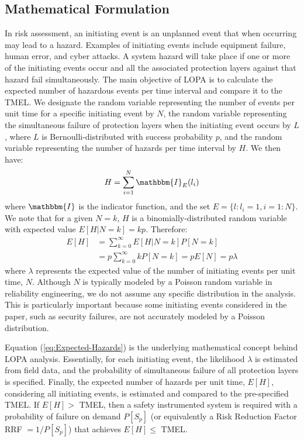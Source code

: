 \documentclass[journal]{IEEEtran}
\begin{document}
\subsection{Mathematical Formulation}
In risk assessment, an initiating event is an unplanned event that when occurring may lead to a hazard. Examples of initiating events include equipment failure, human error, and cyber attacks. A system hazard will take place if one or more of the initiating events occur and all the associated protection layers against that hazard fail simultaneously. The main objective of LOPA is to calculate the expected number of hazardous events per time interval and compare it to the TMEL. We designate the random variable representing the number of events per unit time for a specific initiating event by $N$, the random variable representing the simultaneous failure of protection layers when the initiating event occurs by $L$, where $L$ is Bernoulli-distributed with success probability $p$, and the random variable representing the number of hazards per time interval by $H$. We then have:
\begin{align}
H = \sum_{i=1}^N \mathbbm{I}_E(l_i)
\end{align}
where $\mathbbm{I}$ is the indicator function, and the set $E=\{l:l_i=1, i=1:N\}$. We note that for a given $N=k$, $H$ is a binomially-distributed random variable with expected value $E[H|N=k] = kp$. Therefore:
\begin{align}
E[H] &= \sum_{k=0}^\infty E[H|N=k]P[N=k] \nonumber \\
     &= p \sum_{k=0}^\infty kP[N=k] = p E[N] = p \lambda
\label{eq:Expected-Hazards}
\end{align}
where $\lambda$ represents the expected value of the number of initiating events per unit time, $N$. Although $N$ is typically modeled by a Poisson random variable in reliability engineering, we do not assume any specific distribution in the analysis. This is particularly important because some initiating events considered in the paper, such as security failures, are not accurately modeled by a Poisson distribution.

Equation (\ref{eq:Expected-Hazards}) is the underlying mathematical concept behind LOPA analysis. Essentially, for each initiating event, the likelihood $\lambda$ is estimated from field data, and the probability of simultaneous failure of all protection layers is specified. Finally, the expected number of hazards per unit time, $E[H]$, considering all initiating events, is estimated and compared to the pre-specified TMEL. If $E[H] > $ TMEL, then a safety instrumented system is required with a probability of failure on demand $P[S_p]$ (or equivalently a Risk Reduction Factor RRF $=1/P[S_p]$) that achieves $E[H] \leq $ TMEL.
\end{document}
